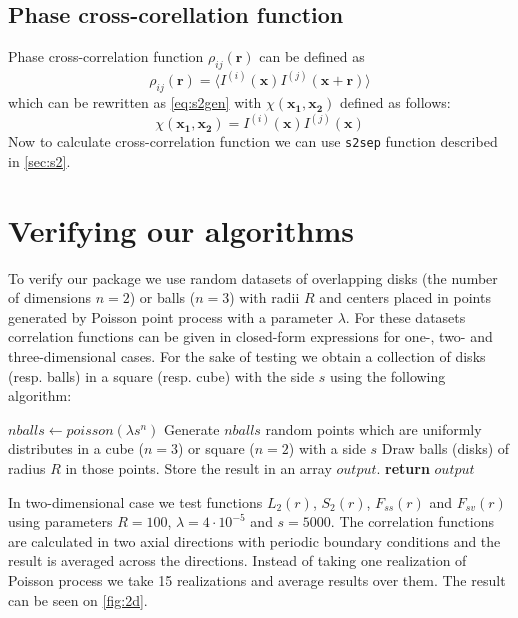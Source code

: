 \documentclass[reprint,amsmath,amssymb,aps,pre,showkeys,showpacs,nofootinbib]{revtex4-1}
\newcommand{\code}[1]{\colorbox{light-gray}{\texttt{#1}}}
\begin{document}
\subsection{Phase cross-corellation function}

Phase cross-correlation function $\rho_{ij}(\bm{r})$ can be defined as
\begin{equation*}
  \rho_{ij}(\bm{r}) = \langle I^{(i)}(\bm{x}) I^{(j)}(\bm{x} + \bm{r}) \rangle
\end{equation*}
which can be rewritten as \cref{eq:s2gen} with $\chi(\bm{x_1}, \bm{x_2})$
defined as follows:
\begin{equation*}
  \chi(\bm{x_1}, \bm{x_2}) = I^{(i)}(\bm{x}) I^{(j)}(\bm{x})
\end{equation*}
Now to calculate cross-correlation function we can use \code{s2sep} function
described in \cref{sec:s2}.

\section{Verifying our algorithms}
\label{sec:verification}
To verify our package we use random datasets of overlapping disks (the number of
dimensions $n = 2$) or balls ($n = 3$) with radii $R$ and centers placed in
points generated by Poisson point process with a parameter $\lambda$. For these
datasets correlation functions can be given in closed-form expressions for one-,
two- and three-dimensional cases. For the sake of testing we obtain a collection
of disks (resp. balls) in a square (resp. cube) with the side $s$ using the
following algorithm:
\begin{algorithmic}[1]
  \label{testdata}
    \State $nballs \gets poisson(\lambda s^n)$ 
    \State Generate $nballs$ random points which are uniformly distributes in
    a cube ($n = 3$) or square ($n = 2$) with a side $s$
    \State Draw balls (disks) of radius $R$ in those points. Store the result in
    an array $output$.
    \State \textbf{return} $output$
  \EndProcedure
\end{algorithmic}

In two-dimensional case we test functions $L_2(r)$, $S_2(r)$, $F_{ss}(r)$ and
$F_{sv}(r)$ using parameters $R = 100$, $\lambda = 4\cdot10^{-5}$ and
$s = 5000$. The correlation functions are calculated in two axial directions
with periodic boundary conditions and the result is averaged across the
directions. Instead of taking one realization of Poisson process we take 15
realizations and average results over them. The result can be seen on
\cref{fig:2d}.
\end{document}

